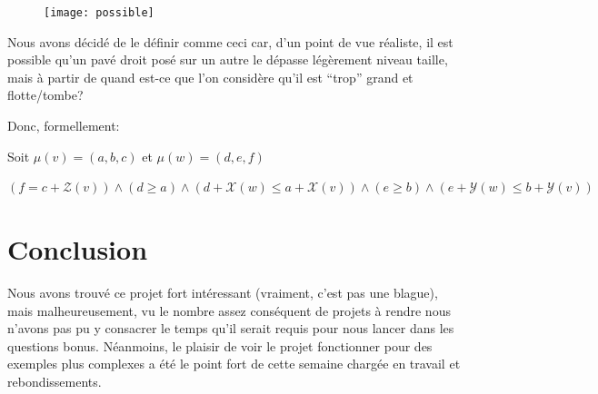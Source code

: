 \documentclass[a4paper,10pt]{article}
\begin{document}
\begin{figure}[htb!]
\centering
\texttt{[image: possible]}
\end{figure}

Nous avons décidé de le définir comme ceci car, d'un point de vue réaliste, il est possible qu'un pavé droit posé sur un autre le dépasse légèrement niveau taille, mais à partir de quand est-ce que l'on considère qu'il est ``trop'' grand et flotte/tombe?

Donc, formellement:

Soit $\mu(v) = (a,b,c)$ et $\mu(w) = (d,e,f)$

$(f = c + \mathcal{Z}(v)) \land (d \geq a) \land (d+\mathcal{X}(w) \leq a+\mathcal{X}(v)) \land (e \geq b) \land(e+\mathcal{Y}(w) \leq b+\mathcal{Y}(v))$

\section{Conclusion}

Nous avons trouvé ce projet fort intéressant (vraiment, c'est pas une blague), mais malheureusement, vu le nombre assez conséquent de projets à rendre nous n'avons pas pu y consacrer le temps qu'il serait requis pour nous lancer dans les questions bonus. Néanmoins, le plaisir de voir le projet fonctionner pour des exemples plus complexes a été le point fort de cette semaine chargée en travail et rebondissements.
\end{document}
